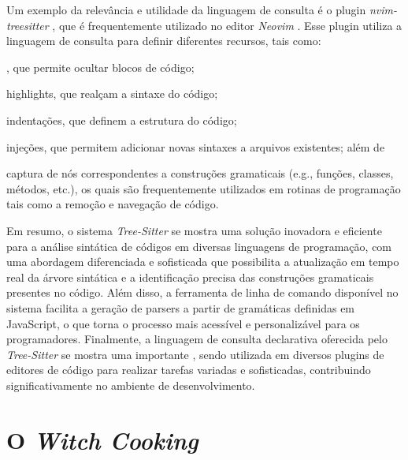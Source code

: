 \documentclass
  [11pt,a4paper,english,brazil,openright,sumario=tradicional,twoside]
  {abntex2}
\newcommand{\treesitter}{\textit{Tree-Sitter}\xspace}
\newcommand{\witchcooking}{\textit{Witch Cooking}\xspace}
\begin{document}
  Um exemplo da relevância e utilidade da linguagem de consulta é o plugin
  \textit{nvim-treesitter} \cite{nvim-treesitter-2023-nvim}, que é
  frequentemente utilizado no editor \textit{Neovim}
  \cite{neovim-2023-hyperextensible}. Esse plugin utiliza a linguagem de
  consulta para definir diferentes recursos, tais como:
  \begin{inparaenum}
    \item \textit{}, que permite ocultar blocos de código;
    \item highlights, que realçam a sintaxe do código;
    \item indentações, que definem a estrutura do código;
    \item injeções, que permitem adicionar novas sintaxes a arquivos
          existentes; além de
    \item captura de nós correspondentes a construções gramaticais (e.g.,
          funções, classes, métodos, etc.), os quais são frequentemente
          utilizados em rotinas de programação tais como a remoção e navegação
          de código.
  \end{inparaenum}

  Em resumo, o sistema \treesitter se mostra uma solução inovadora e eficiente
  para a análise sintática de códigos em diversas linguagens de programação,
  com uma abordagem diferenciada e sofisticada que possibilita a atualização em
  tempo real da árvore sintática e a identificação precisa das construções
  gramaticais presentes no código. Além disso, a ferramenta de linha de comando
  disponível no sistema facilita a geração de parsers a partir de gramáticas
  definidas em JavaScript, o que torna o processo mais acessível e
  personalizável para os programadores. Finalmente, a linguagem de consulta
  declarativa oferecida pelo \treesitter se mostra uma importante
  \textit{}, sendo utilizada em diversos plugins de editores de
  código para realizar tarefas variadas e sofisticadas, contribuindo
  significativamente no ambiente de desenvolvimento.


  \chapter{O \witchcooking}
  \label{chapter:witch}

\end{document}
